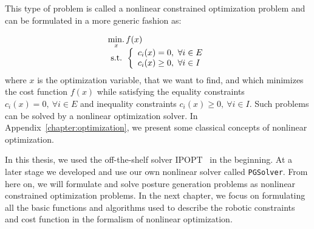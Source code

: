 This type of problem is called a nonlinear constrained optimization problem and can be formulated in a more generic fashion as:

\begin{equation}
\label{eq:optim_form_PG}
  \begin{array}{l}
    \operatorname*{min.}\limits_{x}{f(x)}\\
    \text{ s.t. }
    \left\{
    \begin{array}{l}
      c_i(x) = 0,\ \forall i\in{E}\\
      c_i(x) \geq 0,\ \forall i\in{I}\\
    \end{array}
    \right.
  \end{array}
\end{equation}
where $x$ is the optimization variable, that we want to find, and which minimizes the cost function $f(x)$ while satisfying the equality constraints $c_i(x) = 0,\ \forall i\in{E}$ and inequality constraints $c_i(x) \geq 0,\ \forall i\in{I}$.
Such problems can be solved by a nonlinear optimization solver.
In Appendix~\ref{chapter:optimization}, we present some classical concepts of nonlinear optimization.

In this thesis, we used the off-the-shelf solver IPOPT~\cite{wachter:mathprog:2006} in the beginning.
At a later stage we developed and use our own nonlinear solver called {\tt PGSolver}.
From here on, we will formulate and solve posture generation problems as nonlinear constrained optimization problems.
In the next chapter, we focus on formulating all the basic functions and algorithms used to describe the robotic constraints and cost function in the formalism of nonlinear optimization.
